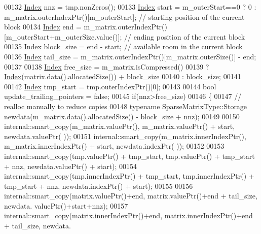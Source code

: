 \begin{DoxyCode}
00132       \hyperlink{group___core___module_a554f30542cc2316add4b1ea0a492ff02}{Index} nnz           = tmp.nonZeros();
00133       \hyperlink{group___core___module_a554f30542cc2316add4b1ea0a492ff02}{Index} start         = m\_outerStart==0 ? 0 : m\_matrix.outerIndexPtr()[m\_outerStart]; \textcolor{comment}{// starting
       position of the current block}
00134       \hyperlink{group___core___module_a554f30542cc2316add4b1ea0a492ff02}{Index} end           = m\_matrix.outerIndexPtr()[m\_outerStart+m\_outerSize.value()]; \textcolor{comment}{// ending
       position of the current block}
00135       \hyperlink{group___core___module_a554f30542cc2316add4b1ea0a492ff02}{Index} block\_size    = end - start;                                                \textcolor{comment}{// available
       room in the current block}
00136       \hyperlink{group___core___module_a554f30542cc2316add4b1ea0a492ff02}{Index} tail\_size     = m\_matrix.outerIndexPtr()[m\_matrix.outerSize()] - end;
00137 
00138       \hyperlink{group___core___module_a554f30542cc2316add4b1ea0a492ff02}{Index} free\_size     = m\_matrix.isCompressed()
00139                           ? \hyperlink{namespace_eigen_a62e77e0933482dafde8fe197d9a2cfde}{Index}(matrix.data().allocatedSize()) + block\_size
00140                           : block\_size;
00141 
00142       \hyperlink{group___core___module_a554f30542cc2316add4b1ea0a492ff02}{Index} tmp\_start = tmp.outerIndexPtr()[0];
00143 
00144       \textcolor{keywordtype}{bool} update\_trailing\_pointers = \textcolor{keyword}{false};
00145       \textcolor{keywordflow}{if}(nnz>free\_size)
00146       \{
00147         \textcolor{comment}{// realloc manually to reduce copies}
00148         \textcolor{keyword}{typename} SparseMatrixType::Storage newdata(m\_matrix.data().allocatedSize() - block\_size + nnz);
00149 
00150         internal::smart\_copy(m\_matrix.valuePtr(),       m\_matrix.valuePtr() + start,      newdata.valuePtr(
      ));
00151         internal::smart\_copy(m\_matrix.innerIndexPtr(),  m\_matrix.innerIndexPtr() + start, newdata.indexPtr(
      ));
00152 
00153         internal::smart\_copy(tmp.valuePtr() + tmp\_start,      tmp.valuePtr() + tmp\_start + nnz,       
      newdata.valuePtr() + start);
00154         internal::smart\_copy(tmp.innerIndexPtr() + tmp\_start, tmp.innerIndexPtr() + tmp\_start + nnz,  
      newdata.indexPtr() + start);
00155 
00156         internal::smart\_copy(matrix.valuePtr()+end,       matrix.valuePtr()+end + tail\_size,      newdata.
      valuePtr()+start+nnz);
00157         internal::smart\_copy(matrix.innerIndexPtr()+end,  matrix.innerIndexPtr()+end + tail\_size, newdata.

\end{DoxyCode}
